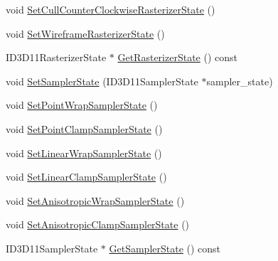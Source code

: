 \begin{DoxyCompactItemize}
\item 
void \hyperlink{structmage_1_1_rendering_state_aa66215168ce8752ef20065b161bad1fc}{Set\+Cull\+Counter\+Clockwise\+Rasterizer\+State} ()
\item 
void \hyperlink{structmage_1_1_rendering_state_a392b339b24950c71bfc7285bcca5eacf}{Set\+Wireframe\+Rasterizer\+State} ()
\item 
I\+D3\+D11\+Rasterizer\+State $\ast$ \hyperlink{structmage_1_1_rendering_state_ac7d1a6360ebd65b9345f9f4e38262fe7}{Get\+Rasterizer\+State} () const
\item 
void \hyperlink{structmage_1_1_rendering_state_ab0c8450e46a9172871e5a40f2303bfb2}{Set\+Sampler\+State} (I\+D3\+D11\+Sampler\+State $\ast$sampler\+\_\+state)
\item 
void \hyperlink{structmage_1_1_rendering_state_ab8cebd05d1b01ec22f311aa0f1c1dc7e}{Set\+Point\+Wrap\+Sampler\+State} ()
\item 
void \hyperlink{structmage_1_1_rendering_state_aabf9e70b12cb12560e6c6c880bbc08ca}{Set\+Point\+Clamp\+Sampler\+State} ()
\item 
void \hyperlink{structmage_1_1_rendering_state_a6ffd109271b4988fa6d4a6fc2daa2125}{Set\+Linear\+Wrap\+Sampler\+State} ()
\item 
void \hyperlink{structmage_1_1_rendering_state_a4f414c7bed884194bd93d89f893c86b4}{Set\+Linear\+Clamp\+Sampler\+State} ()
\item 
void \hyperlink{structmage_1_1_rendering_state_a92318b9b250555ca1d6b516d49371abc}{Set\+Anisotropic\+Wrap\+Sampler\+State} ()
\item 
void \hyperlink{structmage_1_1_rendering_state_a52b80c58015fb64f0b8afa7712807ccd}{Set\+Anisotropic\+Clamp\+Sampler\+State} ()
\item 
I\+D3\+D11\+Sampler\+State $\ast$ \hyperlink{structmage_1_1_rendering_state_a251773f942157b07a7d3272e5e3c8a2e}{Get\+Sampler\+State} () const
\end{DoxyCompactItemize}
